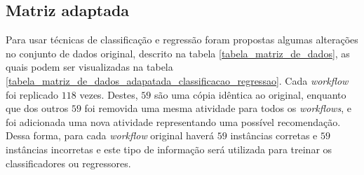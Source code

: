 \documentclass[10pt,letterpaper]{article}
\begin{document}
\subsection*{Matriz adaptada}
Para usar técnicas de classificação e regressão foram propostas algumas alterações no conjunto de dados original, descrito na tabela \ref{tabela_matriz_de_dados}, as quais podem ser visualizadas na tabela \ref{tabela_matriz_de_dados_adapatada_classificacao_regressao}. Cada \emph{workflow} foi replicado \(118\) vezes. Destes, \(59\) são uma cópia idêntica ao original, enquanto que dos outros \(59\) foi removida uma mesma atividade para todos os \emph{workflows}, e foi adicionada uma nova atividade representando uma possível recomendação. Dessa forma, para cada \emph{workflow} original haverá \(59\) instâncias corretas e \(59\) instâncias incorretas e este tipo de informação será utilizada para treinar os classificadores ou regressores.
\end{document}

